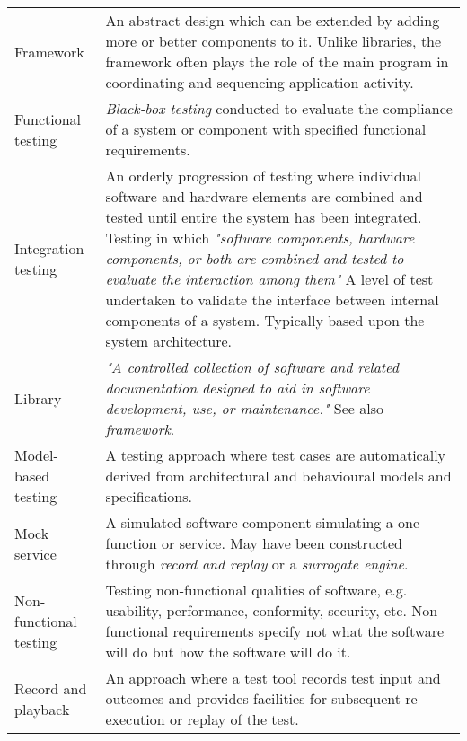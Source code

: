 \documentclass[12pt,a4paper,oneside,pdftex]{report}
\begin{document}
\begin{longtable}{@{}p{}p{}@{}}
Framework & An abstract design which can be extended by adding more or better components to it. Unlike libraries, the framework often plays the role of the main program in coordinating and sequencing application activity. \citep{laukkanen2006data, ieee2010systems}  \\[0.3cm]

Functional testing & \emph{Black-box testing} conducted to evaluate the compliance of a system or component with specified functional requirements. \citep{ieee2010systems} \\[0.3cm] 

Integration testing & An orderly progression of testing where individual software and hardware elements are combined and tested until entire the system has been integrated. \citep{burnstein2003practical} Testing in which \emph{"software components, hardware components, or both are combined and tested to evaluate the interaction among them"} \citep{ieee2010systems} A level of test undertaken to validate the interface between internal components of a system. Typically based upon the system architecture. \citep{craig2002systematic} \\[0.3cm]

Library & \emph{"A controlled collection of software and related documentation designed to aid in software development, use, or maintenance."} See also \emph{framework}. \citep{ieee2010systems} \\[0.3cm]

Model-based testing & A testing approach where test cases are automatically derived from architectural and behavioural models and specifications. \citep{apfelbaum1997model} \\[0.3cm]

Mock service & A simulated software component simulating a one function or service. May have been constructed through \emph{record and replay} or a \emph{surrogate engine}. \\[0.3cm]

Non-functional testing & Testing non-functional qualities of software, e.g. usability, performance, conformity, security, etc. Non-functional requirements specify not what the software will do but how the software will do it. \citep{ieee2010systems} \\[0.3cm]

Record and playback & An approach where a test tool records test input and outcomes and provides facilities for subsequent re-execution or replay of the test. \citep{burnstein2003practical, ieee2010systems} \\[0.3cm]


\end{longtable}
\end{document}
